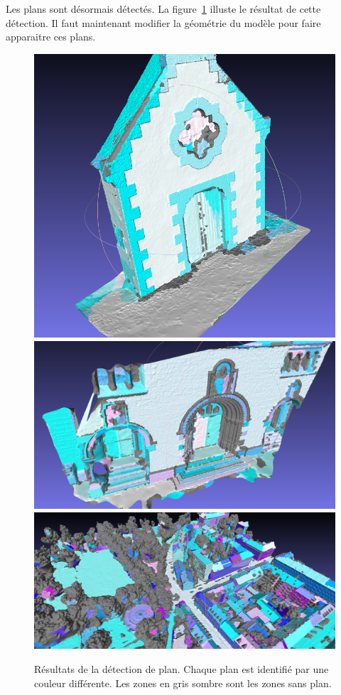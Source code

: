 ﻿\documentclass[12pt, twoside]{article}
\begin{document}
Les plans sont désormais détectés. La figure~\ref{fig:resultPlan} illuste le résultat de cette détection. Il faut maintenant modifier la géométrie du modèle pour faire apparaitre ces plans.

\begin{figure}[h]
\centering
\includegraphics[scale=0.3]{Plan1.png} \includegraphics[scale=0.3]{Plan2.png} \includegraphics[scale=0.3]{Plan3.png}
\caption{\label{fig:resultPlan} Résultats de la détection de plan. Chaque plan est identifié par une couleur différente. Les zones en gris sombre sont les zones sans plan.}
\end{figure}
\end{document}
